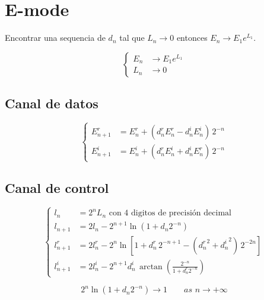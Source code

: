 \documentclass[10pt,a4paper]{book}
\begin{document}
\section{E-mode}

   Encontrar una sequencia de $d_n$ tal que $L_n \rightarrow 0$ entonces $E_n \rightarrow E_1 e^{L_1}$.

\begin{equation} \label{eq:bkm_E_mode}
   \left\{
      \begin{aligned}
         E_n & \rightarrow E_1 e^{L_1} \\
         L_n & \rightarrow 0
      \end{aligned}
   \right.
\end{equation}

   \subsection{Canal de datos}
\begin{equation} \label{eq:bkm_eqs_E}
   \left\{
      \begin{aligned}
         E_{n+1}^r &= E_n^r + ( d_n^r E_n^r - d_n^i E_n^i ) \,2^{-n} \\
         E_{n+1}^i &= E_n^i + ( d_n^r E_n^i + d_n^i E_n^r ) \,2^{-n}
      \end{aligned}
   \right.
\end{equation}

   \subsection{Canal de control}
\begin{equation} \label{eq:bkm_eqs_l}
   \left\{
      \begin{aligned}
         l_n         &= 2^n L_n \,\,\text{con 4 digitos de precisión decimal} \\
         l_{n+1}     &= 2 l_n   - 2^{n+1} \ln( 1 + d_n 2^{-n} )                                             \\
         l_{n+1}^r   &= 2 l_n^r - 2^{n}   \ln[ 1 + d_n^r \, 2^{-n+1} - ({d_n^r}^2 + {d_n^i}^2) \, 2^{-2n} ] \\
         l_{n+1}^i   &= 2 l_n^i - 2^{n+1} d_n^i \, \arctan{ \left( \frac{2^{-n}}{1+d_n^r 2^{-n}} \right) }
      \end{aligned}
   \right.
\end{equation}

\begin{equation} \label{eq:bkm_eqs_l_limit}
   2^{n} \ln( 1 + d_n 2^{-n} ) \rightarrow 1 \qquad as \,\, n \rightarrow +\infty
\end{equation}
\end{document}
